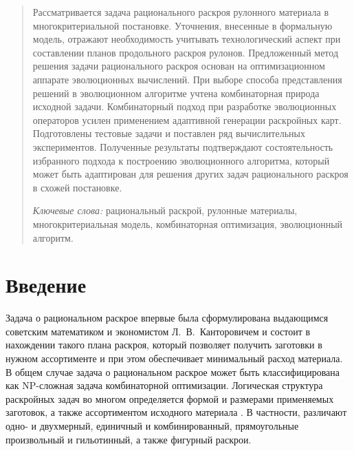 \documentclass[12pt]{article}
\begin{document}
\begin{abstract}
Рассматривается задача рационального раскроя рулонного материала в 
многокритериальной постановке. Уточнения, внесенные в формальную модель, 
отражают необходимость учитывать технологический аспект при составлении планов 
продольного раскроя рулонов. Предложенный метод решения задачи рационального 
раскроя основан на оптимизационном аппарате эволюционных вычислений. При выборе 
способа представления решений в эволюционном алгоритме учтена комбинаторная 
природа исходной задачи. Комбинаторный подход при разработке эволюционных 
операторов усилен применением адаптивной генерации раскройных карт. 
Подготовлены тестовые задачи и поставлен ряд вычислительных экспериментов. 
Полученные результаты подтверждают состоятельность избранного подхода к 
построению эволюционного алгоритма, который может быть адаптирован для решения 
других задач рационального раскроя в схожей постановке.
\smallskip

\noindent\textit{Ключевые слова:} рациональный раскрой, 
рулонные материалы, многокритериальная модель, комбинаторная оптимизация, 
эволюционный алгоритм.
\end{abstract}    


\section{Введение}

Задача о рациональном раскрое впервые была сформулирована выдающимся советским 
математиком и экономистом Л.~В.~Канторовичем 
\cite{bib:kantorovich39} 
и состоит в нахождении такого плана раскроя, который позволяет получить 
заготовки в нужном ассортименте и при этом обеспечивает минимальный расход 
материала. В общем случае задача о рациональном раскрое может быть 
классифицирована как NP-сложная задача комбинаторной оптимизации. 
Логическая структура раскройных задач во многом определяется формой и размерами 
применяемых заготовок, а также ассортиментом исходного материала 
\cite{bib:wascher07}. 
В частности, различают одно- и двухмерный, единичный и комбинированный, 
прямоугольные произвольный и гильотинный, а также фигурный раскрои.
\end{document}
